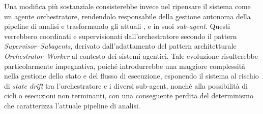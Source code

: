 
Una modifica più sostanziale consisterebbe invece nel ripensare il sistema \system{} come un agente orchestratore, rendendolo responsabile della gestione autonoma della pipeline di analisi e trasformando gli attuali \classifier{}, \sreagent{} e \codeagent{} in suoi \emph{sub-agent}. Questi verrebbero coordinati e supervisionati dall'orchestratore secondo il pattern \emph{Supervisor--Subagents}, derivato dall'adattamento del pattern architetturale \emph{Orchestrator--Worker} al contesto dei sistemi agentici. Tale evoluzione risulterebbe particolarmente impegnativa, poiché introdurrebbe una maggiore complessità nella gestione dello stato e del flusso di esecuzione, esponendo il sistema al rischio di \emph{state drift} tra l'orchestratore e i diversi sub-agent, nonché alla possibilità di cicli o esecuzioni non terminanti, con una conseguente perdita del determinismo che caratterizza l'attuale pipeline di analisi.